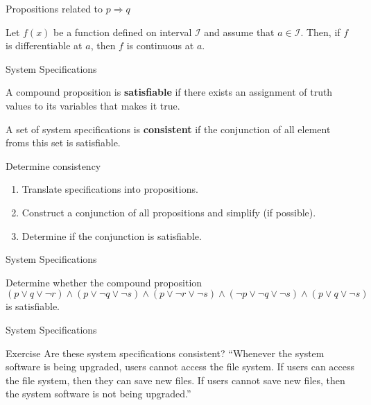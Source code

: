 \documentclass{beamer}
\begin{document}
\begin{frame}[t]{Propositions related to $p \Rightarrow q$}
    \begin{theorem}
        Let $f(x)$ be a function defined on interval $\mathcal{I}$ and assume that $a \in \mathcal{I}$. Then, if $f$ is differentiable at $a$, then $f$ is continuous at $a$.
    \end{theorem}
\end{frame}

\begin{frame}{System Specifications}
    \begin{definition}
        A compound proposition is \textbf{satisfiable} if there exists an assignment of truth values to its variables that makes it true. 
    \end{definition}
    \begin{definition}
        A set of system specifications is \textbf{consistent} if the conjunction of all element froms this set is satisfiable. 
    \end{definition}
    \begin{block}{Determine consistency}
        \begin{enumerate}[1]
            \item Translate specifications into propositions.
            \item Construct a conjunction of all propositions and simplify (if possible).
            \item Determine if the conjunction is satisfiable. 
        \end{enumerate}
    \end{block}
\end{frame}

\begin{frame}[t]{System Specifications}
    \begin{example}
        Determine whether the compound proposition $$(p \vee q \vee \neg r) \wedge (p \vee \neg q \vee \neg s) \wedge (p \vee \neg r \vee \neg s) \wedge (\neg p \vee \neg q \vee \neg s) \wedge (p \vee q \vee \neg s)$$ is satisfiable.
        
    \end{example}
\end{frame}

\begin{frame}[t]{System Specifications}
    \begin{block}{Exercise}
        Are these system specifications consistent? “Whenever the system software is being upgraded, users cannot access the file system. If users can access the file system, then they can save new files. If users cannot save new files, then the system software is not being upgraded.”
    \end{block} 
\end{frame}
\end{document}
